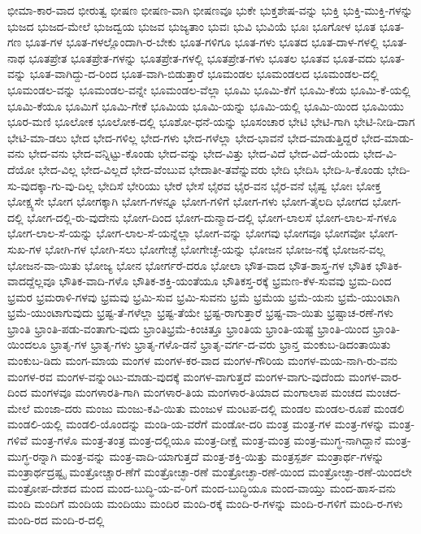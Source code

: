 {ಭೀಮಾ-ಕಾರ-ವಾದ
ಭೀರುತ್ವ
ಭೀಷಣ
ಭೀಷಣ-ವಾಗಿ
ಭೀಷಣವೂ
ಭುಕೇ
ಭುಕ್ತಶೇಷ-ವನ್ನು
ಭುಕ್ತಿ
ಭುಕ್ತಿ-ಮುಕ್ತಿ-ಗಳನ್ನು
ಭುಜದ
ಭುಜದ-ಮೇಲೆ
ಭುಜದ್ವಯ
ಭುಜವ
ಭುಜ್ಯತಾಂ
ಭುವಃ
ಭುವಿ
ಭುವಿಯೆ
ಭೂಃ
ಭೂಗೋಳ
ಭೂತ
ಭೂತ-ಗಣ
ಭೂತ-ಗಳ
ಭೂತ-ಗಳಲ್ಲೊಂದಾಗಿ-ರ-ಬೇಕು
ಭೂತ-ಗಳಿಗೂ
ಭೂತ-ಗಳು
ಭೂತದ
ಭೂತ-ದಾಳ-ಗಳಲ್ಲಿ
ಭೂತ-ನಾಥ
ಭೂತಪ್ರೇತ
ಭೂತಪ್ರೇತ-ಗಳನ್ನು
ಭೂತಪ್ರೇತ-ಗಳಲ್ಲಿ
ಭೂತಪ್ರೇತ-ಗಳು
ಭೂತಲ
ಭೂತವ
ಭೂತ-ವದು
ಭೂತ-ವನ್ನು
ಭೂತ-ವಾಗಿದ್ದು-ದ-ರಿಂದ
ಭೂತ-ವಾಗಿ-ಬಿಡುತ್ತಾರೆ
ಭೂಮಂಡಲ
ಭೂಮಂಡಲದ
ಭೂಮಂಡಲ-ದಲ್ಲಿ
ಭೂಮಂಡಲ-ವನ್ನು
ಭೂಮಂಡಲ-ವನ್ನೇ
ಭೂಮಂಡಲ-ವೆಲ್ಲಾ
ಭೂಮಿ
ಭೂಮಿ-ಕೆಗೆ
ಭೂಮಿ-ಕೆಯ
ಭೂಮಿ-ಕೆ-ಯಲ್ಲಿ
ಭೂಮಿ-ಕೆಯೂ
ಭೂಮಿಗೆ
ಭೂಮಿ-ಗೇಕೆ
ಭೂಮಿಯ
ಭೂಮಿ-ಯನ್ನು
ಭೂಮಿ-ಯಲ್ಲಿ
ಭೂಮಿ-ಯಿಂದ
ಭೂಮಿಯು
ಭೂರ-ಮಣಿ
ಭೂಲೋಕ
ಭೂಲೋಕ-ದಲ್ಲಿ
ಭೂಶೋ-ಧನೆ-ಯನ್ನು
ಭೂಸಂಚಾರ
ಭೇಟಿ
ಭೇಟಿ-ಗಾಗಿ
ಭೇಟಿ-ನೀಡಿ-ದಾಗ
ಭೇಟಿ-ಮಾ-ಡಲು
ಭೇದ
ಭೇದ-ಗಳಿಲ್ಲ
ಭೇದ-ಗಳು
ಭೇದ-ಗಳೆಲ್ಲಾ
ಭೇದ-ಭಾವನೆ
ಭೇದ-ಮಾಡುತ್ತಿದ್ದರೆ
ಭೇದ-ಮಾಡು-ವನು
ಭೇದ-ವನು
ಭೇದ-ವನ್ನಿಟ್ಟು-ಕೊಂಡು
ಭೇದ-ವನ್ನು
ಭೇದ-ವಿತ್ತು
ಭೇದ-ವಿದೆ
ಭೇದ-ವಿದೆ-ಯೆಂದು
ಭೇದ-ವಿ-ದೆಯೋ
ಭೇದ-ವಿಲ್ಲ
ಭೇದ-ವಿಲ್ಲದೆ
ಭೇದ-ವೆಂಬುವ
ಭೇದಾತೀ-ತವೆನ್ನುವರು
ಭೇದಿ
ಭೇದಿಸಿ
ಭೇದಿ-ಸಿ-ಕೊಂಡು
ಭೇದಿ-ಸು-ವುದಕ್ಕಾ-ಗು-ವು-ದಿಲ್ಲ
ಭೇದಿಸೆ
ಭೇರಿಯು
ಭೇರೆ
ಭೇಸೆ
ಭೈರವ
ಭೈರ-ವನ
ಭೈರ-ವನೆ
ಭೈಷ್ವ
ಭೋಃ
ಭೋಕ್ತ
ಭೋಕ್ಷ್ಯಸೇ
ಭೋಗ
ಭೋಗಕ್ಕಾಗಿ
ಭೋಗ-ಗಳನ್ನೂ
ಭೋಗ-ಗಳಿಗೆ
ಭೋಗ-ಗಳು
ಭೋಗ-ತೈಲದಿ
ಭೋಗದ
ಭೋಗ-ದಲ್ಲಿ
ಭೋಗ-ದಲ್ಲಿ-ರು-ವುದೇನು
ಭೋಗ-ದಿಂದ
ಭೋಗ-ದುನ್ಮಾದ-ದಲ್ಲಿ
ಭೋಗ-ಲಾಲಸೆ
ಭೋಗ-ಲಾಲ-ಸೆ-ಗಳೂ
ಭೋಗ-ಲಾಲ-ಸೆ-ಯನ್ನು
ಭೋಗ-ಲಾಲ-ಸೆ-ಯನ್ನೆಲ್ಲಾ
ಭೋಗ-ವನ್ನು
ಭೋಗವು
ಭೋಗವೂ
ಭೋಗವೋ
ಭೋಗ-ಸುಖ-ಗಳ
ಭೋಗಿ-ಗಳ
ಭೋಗಿ-ಸಲು
ಭೋಗೇಚ್ಛೆ
ಭೋಗೇಚ್ಛೆ-ಯನ್ನು
ಭೋಜನ
ಭೋಜ-ನಕ್ಕೆ
ಭೋಜನ-ವಲ್ಲ
ಭೋಜನ-ವಾ-ಯಿತು
ಭೋಜ್ಯ
ಭೋನ
ಭೋರ್ಗರೆ-ದರೂ
ಭೋಲಾ
ಭೌತ-ವಾದ
ಭೌತ-ಶಾಸ್ತ್ರ-ಗಳ
ಭೌತಿಕ
ಭೌತಿಕ-ವಾದದ್ದೆಲ್ಲವೂ
ಭೌತಿಕ-ವಾದಿ-ಗಳೊ
ಭೌತಿಕ-ಶಕ್ತಿ-ಯಂತೆಯೂ
ಭೌತಿಕಸ್ತ-ರಕ್ಕೆ
ಭ್ರಮಣ-ಕೆಳ-ಸುವವು
ಭ್ರಮ-ದಿಂದ
ಭ್ರಮರ
ಭ್ರಮರಾಳಿ-ಗಳವು
ಭ್ರಮವು
ಭ್ರಮಿ-ಸುವ
ಭ್ರಮಿ-ಸುವನು
ಭ್ರಮೆ
ಭ್ರಮೆಯ
ಭ್ರಮೆ-ಯನು
ಭ್ರಮೆ-ಯುಂಟಾಗಿ
ಭ್ರಮೆ-ಯುಂಟಾಗುವುದು
ಭ್ರಷ್ಟ-ತೆ-ಗಳೆಲ್ಲಾ
ಭ್ರಷ್ಟ-ತೆಯೇ
ಭ್ರಷ್ಟ-ರಾಗುತ್ತಾರೆ
ಭ್ರಷ್ಟ-ವಾ-ಯಿತು
ಭ್ರಷ್ಟಾಚ-ರಣೆ-ಗಳು
ಭ್ರಾಂತಿ
ಭ್ರಾಂತಿ-ಪಡು-ವಂತಾಗು-ವುದು
ಭ್ರಾಂತಿಭ್ರಮೆ-ಕಿಂಚಿತ್ತೂ
ಭ್ರಾಂತಿಯ
ಭ್ರಾಂತಿ-ಯಷ್ಟೆ
ಭ್ರಾಂತಿ-ಯಿಂದ
ಭ್ರಾಂತಿ-ಯಿಂದಲೂ
ಭ್ರಾತೃ-ಗಳ
ಭ್ರಾತೃ-ಗಳು
ಭ್ರಾತೃ-ಗಳೊ-ಡನೆ
ಭ್ರಾತೃ-ವರ್ಗ-ದ-ವರು
ಭ್ರಾನ್ತ
ಮಂಕುಬ-ಡಿದಂತಾಯಿತು
ಮಂಕುಬ-ಡಿದು
ಮಂಗ-ಮಾಯ
ಮಂಗಳ
ಮಂಗಳ-ಕರ-ವಾದ
ಮಂಗಳ-ಗೌರಿಯ
ಮಂಗಳ-ಮಯ-ನಾಗಿ-ರು-ವನು
ಮಂಗಳ-ರವ
ಮಂಗಳ-ವನ್ನುಂಟು-ಮಾಡು-ವುದಕ್ಕೆ
ಮಂಗಳ-ವಾಗುತ್ತದೆ
ಮಂಗಳ-ವಾಗು-ವುದೆಂದು
ಮಂಗಳ-ವಾರ-ದಿಂದ
ಮಂಗಳವೂ
ಮಂಗಳಾರತಿ-ಗಾಗಿ
ಮಂಗಳಾರ-ತಿಯ
ಮಂಗಳಾರ-ತಿಯಾದ
ಮಂಗಾಲಾಪ
ಮಂಚದ
ಮಂಚದ-ಮೇಲೆ
ಮಂಜಾ-ದರು
ಮಂಜು
ಮಂಜು-ಕವಿ-ಯಿತು
ಮಂಜುಳ
ಮಂಟಪ-ದಲ್ಲಿ
ಮಂಡಲ
ಮಂಡಲ-ರೂಪೆ
ಮಂಡಲಿ
ಮಂಡಲಿ-ಯಲ್ಲಿ
ಮಂಡಲಿ-ಯೊಂದನ್ನು
ಮಂಡಿ-ಯ-ವರೆಗೆ
ಮಂಡೋ-ದರಿ
ಮಂತ್ರ
ಮಂತ್ರ-ಗಳ
ಮಂತ್ರ-ಗಳನ್ನು
ಮಂತ್ರ-ಗಳಿವೆ
ಮಂತ್ರ-ಗಳೊ
ಮಂತ್ರ-ತಂತ್ರ
ಮಂತ್ರ-ದಲ್ಲಿಯೂ
ಮಂತ್ರ-ದೀಕ್ಷೆ
ಮಂತ್ರ-ಮಂತ್ರ
ಮಂತ್ರ-ಮುಗ್ಧ-ನಾಗಿದ್ದಾನೆ
ಮಂತ್ರ-ಮುಗ್ಧ-ರನ್ನಾಗಿ
ಮಂತ್ರ-ವನ್ನು
ಮಂತ್ರ-ವಾದಿ-ಯಾಗುತ್ತದೆ
ಮಂತ್ರ-ಶಕ್ತಿ-ಯಿತ್ತು
ಮಂತ್ರಸ್ಪರ್ಶ
ಮಂತ್ರಾರ್ಥ-ಗಳನ್ನು
ಮಂತ್ರಾರ್ಥದ್ರಷ್ಟೃ
ಮಂತ್ರೋಚ್ಚಾರ-ಣೆಗೆ
ಮಂತ್ರೋಚ್ಛಾ-ರಣೆ
ಮಂತ್ರೋಚ್ಛಾ-ರಣೆ-ಯಿಂದ
ಮಂತ್ರೋಚ್ಛಾ-ರಣೆ-ಯಿಂದಲೇ
ಮಂತ್ರೋಪ-ದೇಶದ
ಮಂದ
ಮಂದ-ಬುದ್ಧಿ-ಯ-ವ-ರಿಗೆ
ಮಂದ-ಬುದ್ಧಿಯೂ
ಮಂದ-ವಾಯ್ತು
ಮಂದ-ಹಾಸ-ವನು
ಮಂದಿ
ಮಂದಿಗೆ
ಮಂದಿಯ
ಮಂದಿಯು
ಮಂದಿರ
ಮಂದಿ-ರಕ್ಕೆ
ಮಂದಿ-ರ-ಗಳನ್ನು
ಮಂದಿ-ರ-ಗಳಿಗೆ
ಮಂದಿ-ರ-ಗಳು
ಮಂದಿ-ರದ
ಮಂದಿ-ರ-ದಲ್ಲಿ
}

